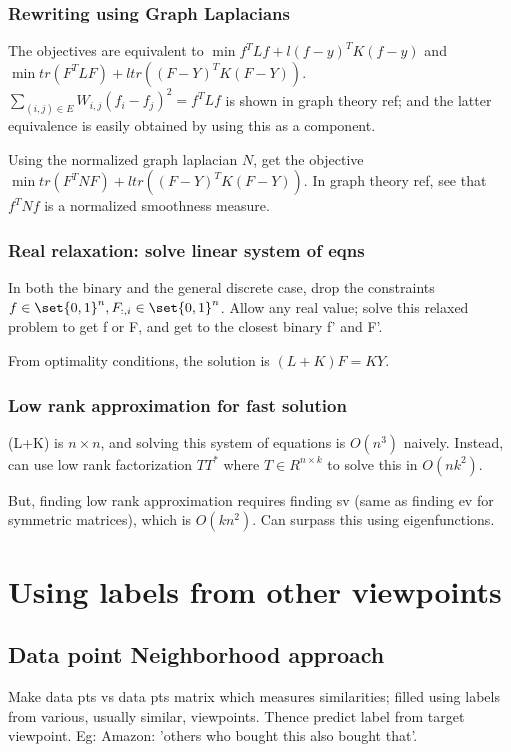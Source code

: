 \documentclass[oneside, article]{memoir}
\begin{document}

\subsection{Rewriting using Graph Laplacians}
The objectives are equivalent to $\min f^{T}Lf + l (f-y)^{T}K(f-y)$ and \\
$\min tr(F^{T}LF) + l tr((F-Y)^{T}K(F-Y))$. $\sum_{(i, j) \in E}W_{i, j}(f_i - f_j)^{2} = f^{T}Lf$ is shown in graph theory ref; and the latter equivalence is easily obtained by using this as a component.

Using the normalized graph laplacian $N$, get the objective $\min tr(F^{T}NF) + l tr((F-Y)^{T}K(F-Y))$. In graph theory ref, see that $f^{T}Nf$ is a normalized smoothness measure.

\subsection{Real relaxation: solve linear system of eqns}
In both the binary and the general discrete case, drop the constraints $f \in \set{0, 1}^{n}, F_{:, i} \in \set{0, 1}^{n}$. Allow any real value; solve this relaxed problem to get f or F, and get to the closest binary f' and F'.

From optimality conditions, the solution is $(L+K)F = KY$.

\subsection{Low rank approximation for fast solution}
(L+K) is $n \times n$, and solving this system of equations is $O(n^{3})$ naively. Instead, can use low rank factorization $TT^{*}$ where $T \in R^{n \times k}$ to solve this in $O(nk^{2})$.

But, finding low rank approximation requires finding sv (same as finding ev for symmetric matrices), which is $O(kn^{2})$. Can surpass this using eigenfunctions. \why

\chapter{Using labels from other viewpoints}
\section{Data point Neighborhood approach}
Make data pts vs data pts matrix which measures similarities; filled using labels from various, usually similar, viewpoints. Thence predict label from target viewpoint. Eg: Amazon: 'others who bought this also bought that'.
\end{document}
